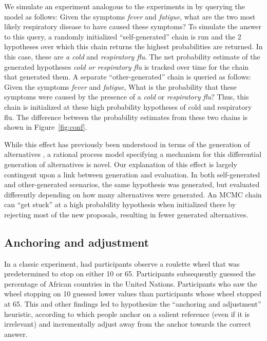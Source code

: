 We simulate an experiment analogous to the experiments in \cite{conf} by querying the model as follows: Given  the symptoms \emph{fever} and \emph{fatigue}, what are the two most likely respiratory disease to have caused these symptoms? To simulate the answer to this query, a randomly initialized ``self-generated'' chain is run and the 2 hypotheses over which this chain returns the highest probabilities are returned. In this case, these are \emph{a cold} and \emph{respiratory flu}. The net probability estimate of the generated hypotheses \emph{cold or respiratory flu} is tracked over time for the chain that generated them. A separate ``other-generated'' chain is queried as follows: Given the symptoms \emph{fever} and \emph{fatigue}, What is the probability that these symptoms were caused by the presence of a \textit{cold} or \textit{respiratory flu}? Thus, this chain is initialized at these high probability hypotheses of cold and respiratory flu. The difference between the probability estimates from these two chains is shown in Figure~\ref{fig:conf}.


While this effect has previously been understood in terms of the generation of alternatives \citep{conf}, a rational process model specifying a mechanism for this differential generation of alternatives is novel. Our explanation of this effect is largely contingent upon a link between generation and evaluation. In both self-generated and other-generated scenarios, the same hypothesis was generated, but evaluated differently depending on how many alternatives were generated. An MCMC chain can ``get stuck'' at a high probability hypothesis when initialized there by rejecting most of the new proposals, resulting in fewer generated alternatives. 


\subsection{Anchoring and adjustment}

In a classic experiment, \citet{tversky} had participants observe a roulette wheel that was predetermined to stop on either 10 or 65. Participants subsequently guessed the percentage of African countries in the United Nations. Participants who saw the wheel stopping on 10 guessed lower values than participants whose wheel stopped at 65. This and other findings led \citet{tversky} to hypothesize the ``anchoring and adjustment'' heuristic, according to which people anchor on a salient reference (even if it is irrelevant) and incrementally adjust away from the anchor towards the correct answer.

